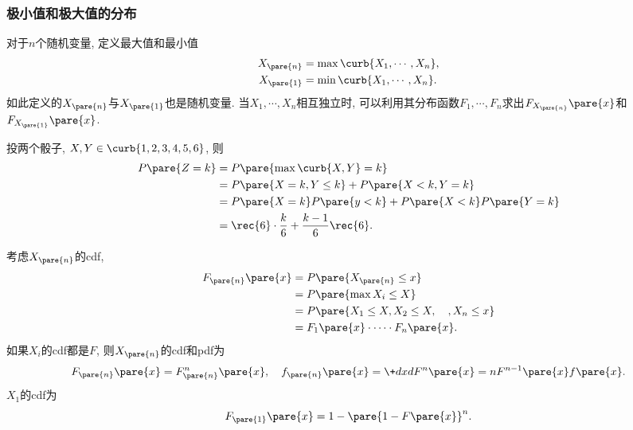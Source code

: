 \documentclass{ctexart}
\begin{document}

\subsubsection{极小值和极大值的分布} %
\label{ssub:极小值和极大值的分布}

对于$n$个随机变量, 定义最大值和最小值
\begin{align*}
    X_{\pare{n}} &= \max\curb{X_1,\cdots,X_n}, \\
    X_{\pare{1}} &= \min\curb{X_1,\cdots,X_n}.
\end{align*}
如此定义的$X_{\pare{n}}$与$X_{\pare{1}}$也是随机变量. 当$X_1,\cdots,X_n$相互独立时, 可以利用其分布函数$F_1,\cdots,F_n$求出$F_{X_{\pare{n}}}\pare{x}$和$F_{X_{\pare{1}}}\pare{x}$.
\begin{ex}
    投两个骰子, $X,Y\in \curb{1,2,3,4,5,6}$, 则
    \begin{align*}
        P\pare{Z=k} &= P\pare{\max\curb{X,Y} = k} \\
        &= P\pare{X=k,Y\le k} + P\pare{X<k,Y=k} \\
        &= P\pare{X=k}P\pare{y<k} + P\pare{X<k}P\pare{Y=k} \\
        &= \rec{6}\cdot\frac{k}{6} + \frac{k-1}{6}\rec{6}.
    \end{align*}
\end{ex}
考虑$X_{\pare{n}}$的cdf,
\begin{align*}
    F_{\pare{n}}\pare{x} &= P\pare{X_{\pare{n}}\le x} \\
    &= P\pare{\max X_i \le X} \\
    &= P\pare{X_1\le X,X_2\le X,\quad, X_n \le x} \\
    &= F_1\pare{x} \cdot\cdots\cdot F_n\pare{x}.
\end{align*}
如果$X_i$的cdf都是$F$, 则$X_{\pare{n}}$的cdf和pdf为
\[ F_{\pare{n}}\pare{x} = F_{\pare{n}}^n \pare{x},\quad f_{\pare{n}}\pare{x} = \+dxd{} F^n\pare{x} = nF^{n-1}\pare{x}f\pare{x}. \]
$X_1$的cdf为
\[ F_{\pare{1}}\pare{x} = 1-\pare{1-F\pare{x}}^n. \]
\end{document}
